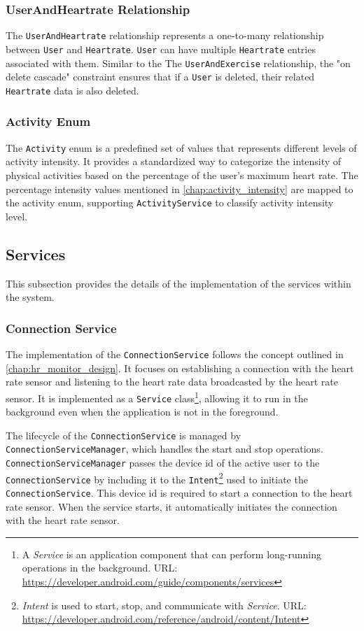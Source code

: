 \subsubsection{UserAndHeartrate Relationship}
The \verb;UserAndHeartrate; relationship represents a one-to-many relationship between \verb;User; and \verb;Heartrate;. 
\verb;User; can have multiple \verb;Heartrate; entries associated with them. Similar to the The \verb;UserAndExercise; relationship, the "on delete cascade" constraint ensures that if a \verb;User; is deleted, their related \verb;Heartrate; data is also deleted.

\subsubsection{Activity Enum}
The \verb;Activity; enum is a predefined set of values that represents different levels of activity intensity. 
It provides a standardized way to categorize the intensity of physical activities based on the percentage of the user's maximum heart rate. 
The percentage intensity values mentioned in \autoref{chap:activity_intensity} are mapped to the activity enum, supporting \verb;ActivityService; to classify activity intensity level.


\subsection{Services}
This subsection provides the details of the implementation of the services within the system.

\subsubsection{Connection Service}
The implementation of the \verb;ConnectionService; follows the concept outlined in \autoref{chap:hr_monitor_design}. It focuses on establishing a connection with the heart rate sensor and listening to the heart rate data broadcasted by the heart rate sensor. 
It is implemented as a \verb;Service; class\footnote{A \emph{Service} is an application component that can perform long-running operations in the background. URL: \url{https://developer.android.com/guide/components/services}}, allowing it to run in the background even when the application is not in the foreground.

The lifecycle of the \verb;ConnectionService; is managed by \verb;ConnectionServiceManager;, which handles the start and stop operations. 
\texttt{ConnectionServiceManager} passes the device id of the active user to the \texttt{ConnectionService} by including it to the \texttt{Intent}\footnote{\emph{Intent} is used to start, stop, and communicate with \emph{Service}. URL: \url{https://developer.android.com/reference/android/content/Intent}} used to initiate the \texttt{ConnectionService}.
This device id is required to start a connection to the heart rate sensor.
When the service starts, it automatically initiates the connection with the heart rate sensor.

